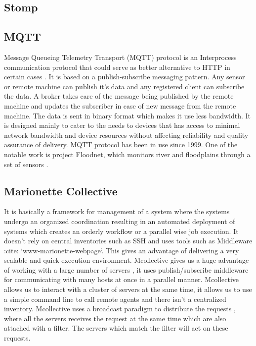      \pv

\subsection{Stomp}

\pv 

\subsection{MQTT}
     
     Message Queueing Telemetry
     Transport (MQTT) protocol is an Interprocess communication
     protocol that could serve as better alternative to HTTP in
     certain cases \cite{www-mqtt}. It is based on a publish-subscribe messaging
     pattern. Any sensor or remote machine can publish it's data and
     any registered client can subscribe the data. A broker takes care
     of the message being published by the remote machine and updates
     the subscriber in case of new message from the remote
     machine. The data is sent in binary format which makes it use
     less bandwidth. It is designed mainly to cater to the needs to
     devices that has access to minimal network bandwidth and device
     resources without affecting reliability and quality assurance of
     delivery. MQTT protocol has been in use since 1999. One of the
     notable work is project Floodnet, which
     monitors river and floodplains through a set of sensors \cite{www-floodnet}.

     \pv

\subsection{Marionette Collective}

     It is basically a framework for management of a system where the
     systems undergo an organized coordination resulting in an
     automated deployment of systems which creates an orderly workflow
     or a parallel wise job execution. It doesn’t rely on central
     inventories such as SSH and uses tools such as Middleware :cite:
     `www-marionette-webpage`. This gives an advantage of delivering a
     very scalable and quick execution environment.  Mcollective gives
     us a huge advantage of working with a large number of servers ,
     it uses publish/subscribe middleware for communicating with many
     hosts at once in a parallel manner. Mcollective allows us to
     interact with a cluster of servers at the same time, it allows us
     to use a simple command line to call remote agents and there
     isn’t a centralized inventory. Mcollective uses a broadcast
     paradigm to distribute the requests , where all the servers
     receives the request at the same time which are also attached
     with a filter. The servers which match the filter will act on
     these requests.

